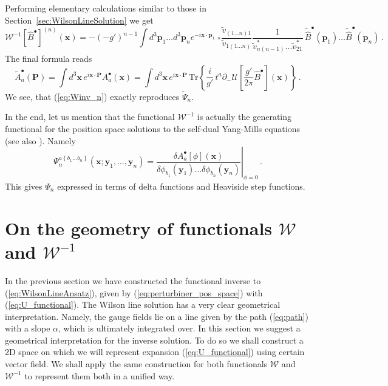 \documentclass[english,american]{article}
\begin{document}
Performing elementary calculations similar to those in Section~\ref{sec:WilsonLineSolution}
we get
\begin{equation}
\mathcal{W}^{-1}\left[\hat{B}^{\bullet}\right]^{\left(n\right)}\left(\mathbf{x}\right)=-\left(-g'\right)^{n-1}\int d^{3}\mathbf{p}_{1}\dots d^{3}\mathbf{p}_{n}e^{-i\mathbf{x}\cdot\mathbf{p}_{1\dots n}}\frac{\tilde{v}_{\left(1\dots n\right)1}}{\tilde{v}_{1\left(1\dots n\right)}}\frac{1}{\tilde{v}_{n\left(n-1\right)}^{*}\dots\tilde{v}_{21}^{*}}\,\tilde{\hat{B}}^{\bullet}\left(\mathbf{p}_{1}\right)\dots\tilde{\hat{B}}^{\bullet}\left(\mathbf{p}_{n}\right)\,.\label{eq:Winv_n}
\end{equation}
The final formula reads
\begin{equation}
\tilde{A}_{a}^{\bullet}\left(\mathbf{P}\right)=\int d^{3}\mathbf{x}\, e^{i\mathbf{x}\cdot\mathbf{P}}A_{a}^{\bullet}\left(\mathbf{x}\right)=\int d^{3}\mathbf{x}\, e^{i\mathbf{x}\cdot\mathbf{P}}\,\mathrm{Tr}\left\{ \frac{i}{g'}\, t^{a}\partial_{-}\mathcal{U}\left[\frac{g'}{2\pi}\hat{B}^{\bullet}\right]\left(\mathbf{x}\right)\right\} \,.
\end{equation}
We see, that (\ref{eq:Winv_n}) exactly reproduces $\tilde{\Psi}_{n}$.

In the end, let us mention that the functional $\mathcal{W}^{-1}$
is actually the generating functional for the position space solutions
to the self-dual Yang-Mills equations \citep{Bardeen1996} (see also
\citep{Chalmers1996,Korepin1996,Cangemi1997,Rosly1997}). Namely
\begin{equation}
\Psi_{n}^{a\left\{ b_{1}\dots b_{n}\right\} }\left(\mathbf{x};\mathbf{y}_{1},\dots,\mathbf{y}_{n}\right)=\left.\frac{\delta A_{a}^{\bullet}\left[\phi\right]\left(\mathbf{x}\right)}{\delta\phi_{b_{1}}\left(\mathbf{y}_{1}\right)\dots\delta\phi_{b_{n}}\left(\mathbf{y}_{n}\right)}\right|_{\phi=0}\,.
\end{equation}
This gives $\Psi_{n}$ expressed in terms of delta functions and Heaviside
step functions. 

\section{On the geometry of functionals $\mathcal{W}$ and $\mathcal{W}^{-1}$}

\label{sec:Geometry}

In the previous section we have constructed the functional inverse
to (\ref{eq:WilsonLineAnsatz}), given by (\ref{eq:perturbiner_pos_space})
with (\ref{eq:U_functional}). The Wilson line solution has a very
clear geometrical interpretation. Namely, the gauge fields lie on
a line given by the path (\ref{eq:path}) with a slope $\alpha$,
which is ultimately integrated over. In this section we suggest a geometrical interpretation for the inverse solution. To do so we shall
construct a 2D space on which we will represent expansion (\ref{eq:U_functional})
using  certain vector field. We shall apply the same construction for
both functionals $\mathcal{W}$ and $\mathcal{W}^{-1}$ to represent
them both in a unified way. 
\end{document}
